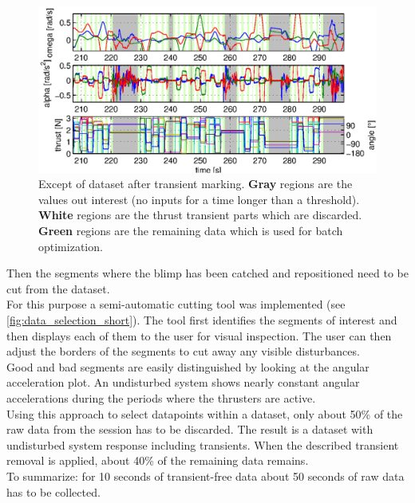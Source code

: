 \begin{figure}[htbp]
\captionsetup{width=0.9\textwidth}
\centering
\includegraphics[scale=0.8]{images/interactive_cut/interactive_cut_long_modified.eps}
\caption{Except of dataset after transient marking. \textbf{Gray} regions are the values out interest (no inputs for a time longer than a threshold). \textbf{White} regions are the thrust transient parts which are discarded. \textbf{Green} regions are the remaining data which is used for batch optimization.}
\label{fig:data_selection_long}
\end{figure}

Then the segments where the blimp has been catched and repositioned need to be cut from the dataset. \\
For this purpose a semi-automatic cutting tool was implemented (see \cref{fig:data_selection_short}). 
The tool first identifies the segments of interest and then displays each of them to the user for visual inspection.
The user can then adjust the borders of the segments to cut away any visible disturbances. \\
Good and bad segments are easily distinguished by looking at the angular acceleration plot.
An undisturbed system shows nearly constant angular accelerations during the periods where the thrusters are active. \\
Using this approach to select datapoints within a dataset, only about 50\% of the raw data from the session has to be discarded.
The result is a dataset with undisturbed system response including transients.
When the described transient removal is applied, about 40\% of the remaining data remains.\\
To summarize: for 10 seconds of transient-free data about 50 seconds of raw data has to be collected.

